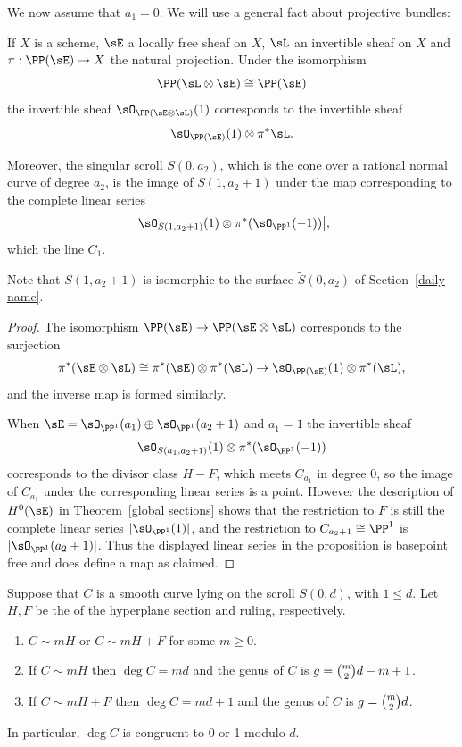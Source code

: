 %
We now assume that $a_{1} = 0$. We will use a general fact about
projective bundles:

\begin{proposition}\label{singular scrolls}
If $X$ is a scheme, $\sE$ a locally free sheaf on $X$, $\sL$ an invertible
sheaf on $X$
and $\pi: \PP(\sE)\to X$ the natural projection.
Under the isomorphism
$$
\PP(\sL \otimes \sE)\cong \PP(\sE)
$$
the invertible sheaf $\sO_{\PP(\sE\otimes \sL)}(1)$ corresponds to the
invertible sheaf
$$\sO_{\PP(\sE)}(1)\otimes \pi^{*}\sL.$$

Moreover, the singular scroll $S(0,a_{2})$, which is the cone over a
rational normal curve of degree $a_{2}$, is the image of
$S(1, a_{2}+1)$ under the map corresponding to the complete linear series
$$
\bigl|\sO_{S(1, a_{2}+1)}(1) \otimes \pi^{*}(\sO_{\PP^{1}}(-1))\bigr|,
$$
which 
%
the line $C_{1}$.
\unif
\end{proposition}

Note that $S(1,a_2+1)$ is isomorphic to the surface $\tilde S(0, a_2)$
of Section~\ref{daily name}.

\begin{proof}
The isomorphism $\PP(\sE) \to \PP(\sE\otimes \sL)$ corresponds to the
surjection
$$\pi^*(\sE \otimes\sL) \cong \pi^*(\sE) \otimes \pi^*(\sL) \to
\sO_{\PP(\sE)}(1) \otimes \pi^*(\sL),$$
and the inverse map is formed similarly.

When $\sE = \sO_{\PP^1}(a_1)\oplus \sO_{\PP^1}(a_2+1)$ and $a_1 = 1$ the
invertible sheaf
$$
\sO_{S(a_1, a_{2}+1)}(1) \otimes \pi^{*}(\sO_{\PP^{1}}(-1))
$$
corresponds to the divisor class $H-F$, which meets $C_{a_1}$	in degree
0, so the image
of $C_{a_1}$ under the corresponding linear series is a point. However
the description of  $H^0(\sE)$ in
Theorem~\ref{global sections} shows that the restriction to $F$
is still the complete linear series $|\sO_{\PP^1}(1)|$, and the
restriction to $C_{{a_2}+1}\cong \PP^1$
is $|\sO_{\PP^1}(a_2+1)|$. Thus the displayed linear series in the
proposition is basepoint free and
does define a map as claimed.
\end{proof}

\begin{theorem}\label{curves on a singular scroll}
Suppose that $C$ is a smooth curve lying on the scroll $S(0,d)$, with
$1\leq d$. Let $H,F$ be the 
%
of the hyperplane
section and ruling, respectively.
\begin{enumerate}
\item $C\sim mH$ or $C\sim mH+F$ for some $m\geq 0$.
\item If $C\sim mH$ then $\deg C = md$ and the genus of $C$ is $g =
\tbinom{m}{2}d-m+1$.
\item If $C\sim mH+F$ then $\deg C = md+1$ and the genus of $C$ is $g =
\tbinom{m}{2}d$.
\end{enumerate}
In particular, $\deg C$ is congruent to 0 or 1 modulo $d$.
\unif
\end{theorem}

